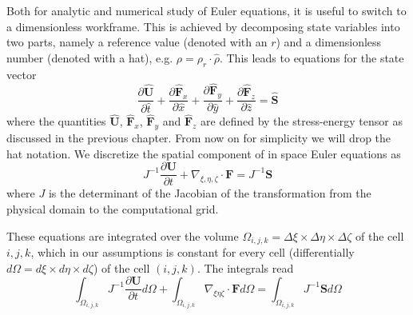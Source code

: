 Both for analytic and numerical study of Euler equations, it is useful to switch to a dimensionless workframe. This is achieved by decomposing state variables into two parts, namely a reference value (denoted with an $r$) and a dimensionless number (denoted with a hat), e.g. $\rho = \rho_r \cdot \hat{\rho}$. This leads to equations for the state vector 
\begin{equation}
\frac{\partial \mathbf{\hat{U}}}{\partial \hat{t}} + \frac{\partial \mathbf{\hat{F}}_x}{\partial \hat{x}} + \frac{\partial \mathbf{\hat{F}}_y}{\partial \hat{y}} + \frac{\partial \mathbf{\hat{F}}_z}{\partial \hat{z}} = \mathbf{\hat{S}}
\end{equation}
where the quantities $\mathbf{\hat{U}}$, $\mathbf{\hat{F}}_x$, $\mathbf{\hat{F}}_y$ and $\mathbf{\hat{F}}_z$ are defined by the stress-energy tensor as discussed in the previous chapter. From now on for simplicity we will drop the hat notation. We discretize the spatial component of in space Euler equations as 
\begin{equation}
J^{-1}\frac{\partial \mathbf{U}}{\partial t} + \nabla_{\xi, \eta, \zeta} \cdot \mathbf{F} = J^{-1} \mathbf{S}
\end{equation}
where $J$ is the determinant of the Jacobian of the transformation from the physical domain to the computational grid.

These equations are integrated over the volume $\Omega_{i, j, k} = \Delta \xi \times \Delta \eta \times \Delta \zeta $ of the cell $i, j, k$, which in our assumptions is constant for every cell (differentially $d \Omega = d \xi \times d \eta \times d \zeta$) of the cell $(i, j, k)$. The integrals read
\begin{equation}
	\int_{\Omega_{i, j, k}} J^{-1} \frac{\partial \mathbf{U}}{\partial t} d \Omega + \int_{\Omega_{i, j, k}} \nabla_{\xi \eta \zeta} \cdot \mathbf{F} d\Omega = \int_{\Omega_{i, j, k}} J^{-1} \mathbf{S} d \Omega
\end{equation}

